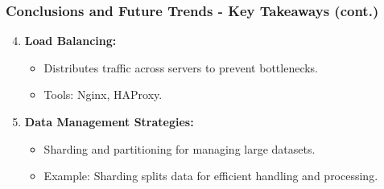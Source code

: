 \documentclass[aspectratio=169]{beamer}
\begin{document}
\begin{frame}[fragile]
    \frametitle{Conclusions and Future Trends - Key Takeaways (cont.)}
    
    \begin{enumerate}\setcounter{enumi}{3}
        \item \textbf{Load Balancing:}
        \begin{itemize}
            \item Distributes traffic across servers to prevent bottlenecks.
            \item Tools: Nginx, HAProxy.
        \end{itemize}
        
        \item \textbf{Data Management Strategies:}
        \begin{itemize}
            \item Sharding and partitioning for managing large datasets.
            \item Example: Sharding splits data for efficient handling and processing.
        \end{itemize}
    \end{enumerate}
\end{frame}
\end{document}
